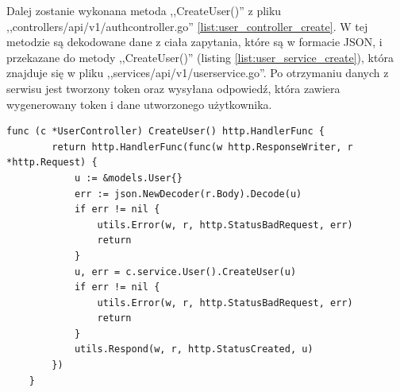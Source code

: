 Dalej zostanie wykonana metoda ,,CreateUser()'' z pliku ,,controllers/api/v1/authcontroller.go'' \ref{list:user_controller_create}.
W tej metodzie są dekodowane dane z ciała zapytania, które są w formacie JSON, i przekazane do metody ,,CreateUser()'' (listing \ref{list:user_service_create}), która znajduje się w pliku ,,services/api/v1/userservice.go''. Po otrzymaniu danych z serwisu jest tworzony token oraz wysyłana odpowiedź, która zawiera wygenerowany token i dane utworzonego użytkownika.
\begin{lstlisting}[label=list:user_controller_create,caption=Kontroler tworzenia użytkownika,basicstyle=\tiny\ttfamily]
    func (c *UserController) CreateUser() http.HandlerFunc {
        return http.HandlerFunc(func(w http.ResponseWriter, r *http.Request) {
            u := &models.User{}
            err := json.NewDecoder(r.Body).Decode(u)
            if err != nil {
                utils.Error(w, r, http.StatusBadRequest, err)
                return
            }
            u, err = c.service.User().CreateUser(u)
            if err != nil {
                utils.Error(w, r, http.StatusBadRequest, err)
                return
            }
            utils.Respond(w, r, http.StatusCreated, u)
        })
    }
\end{lstlisting}

